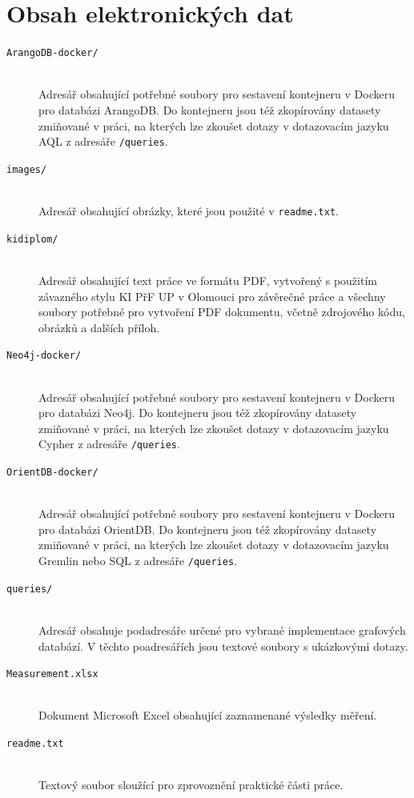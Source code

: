 \documentclass[
  program=infoi,
  biblatex=true,
  figures=true,
  glossaries=false,
  index,
  sourcecodes=true
]{kidiplom}
\begin{document}
\appendix

\section{Obsah elektronických dat}

\begin{description}

\item[\texttt{ArangoDB-docker/}] \hfill \\
Adresář obsahující potřebné soubory pro sestavení kontejneru v Dockeru pro databázi ArangoDB. Do kontejneru jsou též zkopírovány datasety zmiňované v práci, na kterých lze zkoušet dotazy v dotazovacím jazyku AQL z adresáře \texttt{/queries}.

\item[\texttt{images/}] \hfill \\
Adresář obsahující obrázky, které jsou použité v \texttt{readme.txt}.

\item[\texttt{kidiplom/}] \hfill \\
Adresář obsahující text práce ve formátu PDF, vytvořený s použitím závazného stylu KI PřF UP v Olomouci pro závěrečné práce a všechny soubory potřebné pro vytvoření PDF dokumentu, včetně zdrojového kódu, obrázků a dalších příloh.

\item[\texttt{Neo4j-docker/}] \hfill \\
Adresář obsahující potřebné soubory pro sestavení kontejneru v Dockeru pro databázi Neo4j. Do kontejneru jsou též zkopírovány datasety zmiňované v práci, na kterých lze zkoušet dotazy v dotazovacím jazyku Cypher z adresáře \texttt{/queries}.

\item[\texttt{OrientDB-docker/}] \hfill \\
Adresář obsahující potřebné soubory pro sestavení kontejneru v Dockeru pro databázi OrientDB. Do kontejneru jsou též zkopírovány datasety zmiňované v práci, na kterých lze zkoušet dotazy v dotazovacím jazyku Gremlin nebo SQL z adresáře \texttt{/queries}.

\item[\texttt{queries/}] \hfill \\
Adresář obsahuje podadresáře určené pro vybrané implementace grafových databází. V těchto poadresářích jsou textové soubory s ukázkovými dotazy. 

\item[\texttt{Measurement.xlsx}] \hfill \\
Dokument Microsoft Excel obsahující zaznamenané výsledky měření.

\item[\texttt{readme.txt}] \hfill \\
Textový soubor sloužící pro zprovoznění praktické části práce.

\end{description}
\end{document}
